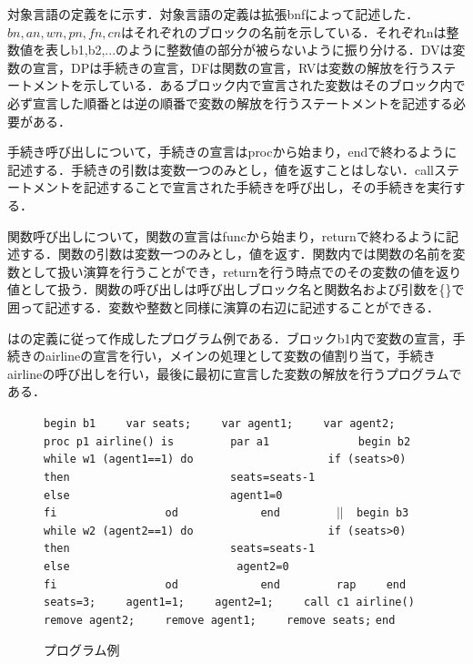 \documentclass[submit,PRO]{ipsj}
\def\|{\verb|}
\begin{document}
対象言語の定義をに示す．対象言語の定義は拡張bnfによって記述した．$bn,an,wn,pn,fn,cn$はそれぞれのブロックの名前を示している．それぞれnは整数値を表しb1,b2,...のように整数値の部分が被らないように振り分ける．DVは変数の宣言，DPは手続きの宣言，DFは関数の宣言，RVは変数の解放を行うステートメントを示している．あるブロック内で宣言された変数はそのブロック内で必ず宣言した順番とは逆の順番で変数の解放を行うステートメントを記述する必要がある．

手続き呼び出しについて，手続きの宣言はprocから始まり，endで終わるように記述する．手続きの引数は変数一つのみとし，値を返すことはしない．callステートメントを記述することで宣言された手続きを呼び出し，その手続きを実行する．

関数呼び出しについて，関数の宣言はfuncから始まり，returnで終わるように記述する．関数の引数は変数一つのみとし，値を返す．関数内では関数の名前を変数として扱い演算を行うことができ，returnを行う時点でのその変数の値を返り値として扱う．関数の呼び出しは呼び出しブロック名と関数名および引数を\{\}で囲って記述する．変数や整数と同様に演算の右辺に記述することができる．

はの定義に従って作成したプログラム例である．ブロックb1内で変数の宣言，手続きのairlineの宣言を行い，メインの処理として変数の値割り当て，手続きairlineの呼び出しを行い，最後に最初に宣言した変数の解放を行うプログラムである．


\begin{figure}[tb]
\vbox{
\hbox{\|begin b1|}
\hbox{\|    var seats;|}
\hbox{\|    var agent1;|}
\hbox{\|    var agent2;|}
\hbox{\|    proc p1 airline() is|}
\hbox{\|        par a1 |}
\hbox{\|            begin b2|}
\hbox{\|                while w1 (agent1==1) do|}
\hbox{\|                    if (seats>0) then|}
\hbox{\|                        seats=seats-1|}
\hbox{\|                    else|}
\hbox{\|                        agent1=0|}
\hbox{\|                    fi|}
\hbox{\|                od|}
\hbox{\|            end|}
\hbox{\|        |$||$\|  begin b3|}
\hbox{\|                while w2 (agent2==1) do|}
\hbox{\|                    if (seats>0) then|}
\hbox{\|                        seats=seats-1|}
\hbox{\|                    else |}
\hbox{\|                        agent2=0|}
\hbox{\|                    fi|}
\hbox{\|                od|}
\hbox{\|            end|}
\hbox{\|        rap|}
\hbox{\|    end|}
\hbox{\|    seats=3;|}
\hbox{\|    agent1=1;|}
\hbox{\|    agent2=1;|}
\hbox{\|    call c1 airline()|}
\hbox{\|    remove agent2;|}
\hbox{\|    remove agent1;|}
\hbox{\|    remove seats;|}
\hbox{\|end|}
}
\centerline{}
\caption{プログラム例}
\label{fig:sample}
\end{figure}
\end{document}
